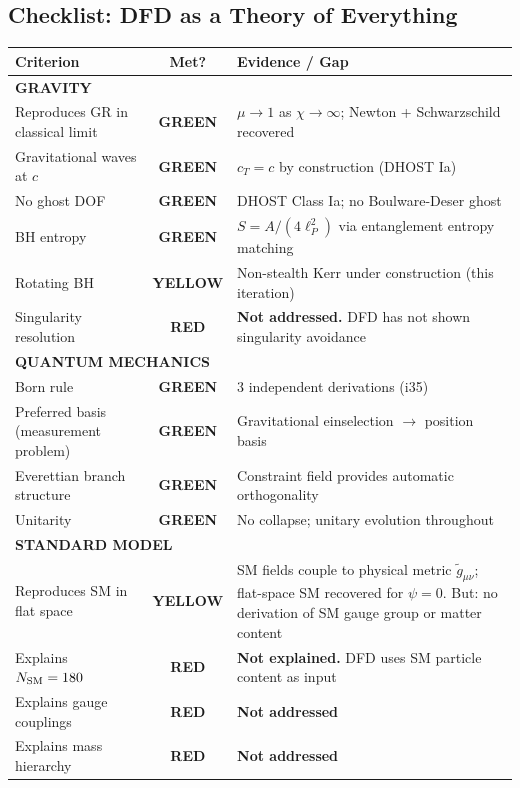 \documentclass[11pt,a4paper]{article}
\newcommand{\GREEN}{\textcolor{dfdgreen}{\textbf{GREEN}}}
\newcommand{\YELLOW}{\textcolor{dfdyellow}{\textbf{YELLOW}}}
\newcommand{\RED}{\textcolor{dfdred}{\textbf{RED}}}
\begin{document}
\subsection{Checklist: DFD as a Theory of Everything}

\begin{center}
\begin{longtable}{p{6cm}cp{6cm}}
\toprule
\textbf{Criterion} & \textbf{Met?} & \textbf{Evidence / Gap} \\
\midrule
\endhead
\multicolumn{3}{l}{\textbf{GRAVITY}} \\
\midrule
Reproduces GR in classical limit & \GREEN & $\mu \to 1$ as $\chi \to \infty$; Newton + Schwarzschild recovered \\
Gravitational waves at $c$ & \GREEN & $c_T = c$ by construction (DHOST Ia) \\
No ghost DOF & \GREEN & DHOST Class Ia; no Boulware-Deser ghost \\
BH entropy & \GREEN & $S = A/(4\ell_P^2)$ via entanglement entropy matching \\
Rotating BH & \YELLOW & Non-stealth Kerr under construction (this iteration) \\
Singularity resolution & \RED & \textbf{Not addressed.} DFD has not shown singularity avoidance \\
\midrule
\multicolumn{3}{l}{\textbf{QUANTUM MECHANICS}} \\
\midrule
Born rule & \GREEN & 3 independent derivations (i35) \\
Preferred basis (measurement problem) & \GREEN & Gravitational einselection $\to$ position basis \\
Everettian branch structure & \GREEN & Constraint field provides automatic orthogonality \\
Unitarity & \GREEN & No collapse; unitary evolution throughout \\
\midrule
\multicolumn{3}{l}{\textbf{STANDARD MODEL}} \\
\midrule
Reproduces SM in flat space & \YELLOW & SM fields couple to physical metric $\tilde{g}_{\mu\nu}$; flat-space SM recovered for $\psi = 0$. But: no derivation of SM gauge group or matter content \\
Explains $N_{\rm SM} = 180$ & \RED & \textbf{Not explained.} DFD uses SM particle content as input \\
Explains gauge couplings & \RED & \textbf{Not addressed} \\
Explains mass hierarchy & \RED & \textbf{Not addressed} \\

\end{longtable}
\end{center}
\end{document}
